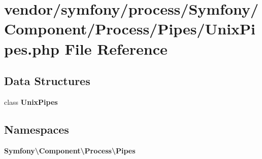 \section{vendor/symfony/process/\+Symfony/\+Component/\+Process/\+Pipes/\+Unix\+Pipes.php File Reference}
\label{_unix_pipes_8php}
\subsection*{Data Structures}
\begin{DoxyCompactItemize}
\item 
class {\bf Unix\+Pipes}
\end{DoxyCompactItemize}
\subsection*{Namespaces}
\begin{DoxyCompactItemize}
\item 
 {\bf Symfony\textbackslash{}\+Component\textbackslash{}\+Process\textbackslash{}\+Pipes}
\end{DoxyCompactItemize}
